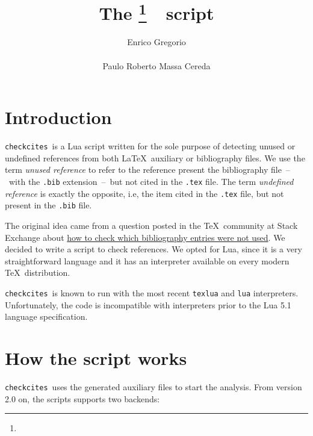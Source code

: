\documentclass[12pt,a4paper]{article}
\title{The \checkcites\footnote{\version}\ \ script}
\author{%
  Enrico Gregorio\\\email{Enrico dot Gregorio at univr dot it}\\[3ex]
  Paulo Roberto Massa Cereda\\\email{cereda at users dot sf dot net}%
}
\date{}
\newcommand{\checkcites}{\texttt{checkcites}}
\newenvironment{infoblock}[1]
  {\par\addvspace{\medskipamount}
   \begin{tcolorbox}[colframe=DarkTurquoise,coltitle=black,fonttitle=\bfseries,title=#1]}
  {\end{tcolorbox}\addvspace{\medskipamount}}
\begin{document}
\maketitle

\tableofcontents

\section{Introduction}
\label{sec:intro}

\checkcites\  is  a  Lua  script  written for  the  sole  purpose  of
detecting unused or undefined  references from both \LaTeX\ auxiliary
or bibliography  files. We  use the  term \emph{unused  reference} to
refer  to the  reference  present the  bibliography file~--~with  the
\verb|.bib|  extension~--~but  not  cited in  the  \verb|.tex|  file.
The  term \emph{undefined  reference} is  exactly the  opposite, i.e,
the  item cited  in  the \verb|.tex|  file, but  not  present in  the
\verb|.bib| file.

The    original     idea    came     from    a     question    posted
in    the     \TeX\    community    at    Stack     Exchange    about
\href{http://tex.stackexchange.com/questions/43276}{how    to   check
which  bibliography entries  were not  used}. We  decided to  write a
script  to check  references. We  opted for  Lua, since it is a  very
straightforward language and it has an interpreter available on every
modern \TeX\ distribution.

\begin{infoblock}{Attention!}
\checkcites\ is known  to run with the most  recent \verb|texlua| and
\verb|lua| interpreters. Unfortunately, the code is incompatible with
interpreters prior to the Lua 5.1 language specification.
\end{infoblock}

\section{How the script works}
\label{sec:howto}

\checkcites\  uses  the  generated   auxiliary  files  to  start  the
analysis. From version 2.0 on, the scripts supports two backends:
\end{document}
